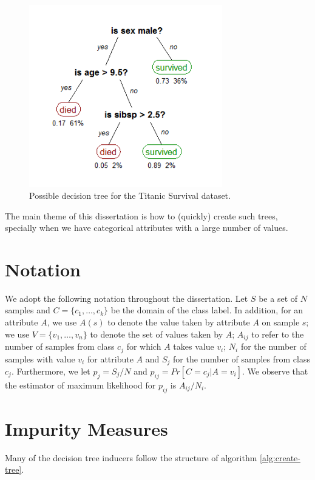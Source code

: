 \begin{figure}[h]
\centering
\includegraphics[width=0.75\textwidth]{titanic-tree}
\caption{Possible decision tree for the Titanic Survival dataset.}
\label{fig:titanic-tree}
\end{figure}

The main theme of this dissertation is how to (quickly) create such trees, specially when we have categorical attributes with a large number of values.

\section{Notation}
\label{sec:notation}
We adopt the following notation throughout the dissertation.
Let $S$ be a set of $N$ samples and 
 $C=\{c_1,\ldots,c_k\}$ be the domain of the class label. 
In addition, for an attribute  $A$, we use $A(s)$ to denote the value taken by attribute
$A$ on sample $s$; we use 
  $V=\{ v_1,\ldots,v_n \}$ to denote the set of values
taken by $A$;
$A_{ij}$ to refer to the  number of samples
from class $c_j$ for which  $A$ takes value $v_i$; 
 $N_i$ for the number of samples with value $v_i$ for attribute $A$
and $S_j$ for the number of samples from class $c_j$.
Furthermore, we let $p_j = S_j /N$ and $p_{ij}= Pr[C=c_j | A = v_i]$.
We observe that the estimator of maximum likelihood for $p_{ij} $ is
$A_{ij} / N_i$.  

\section{Impurity Measures}
Many of the decision tree inducers follow the structure of algorithm \ref{alg:create-tree}.

